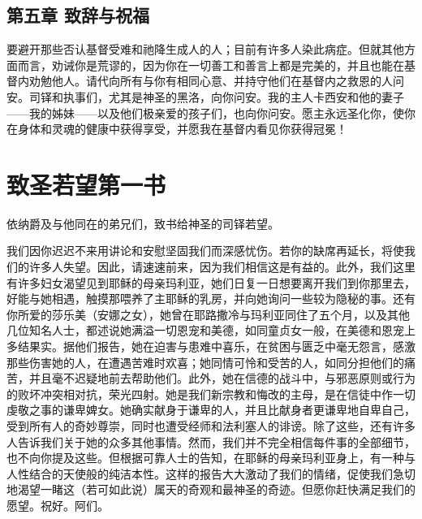 
\subsection{第五章 致辞与祝福}

要避开那些否认基督受难和祂降生成人的人；目前有许多人染此病症。但就其他方面而言，劝诫你是荒谬的，因为你在一切善工和善言上都是完美的，并且也能在基督内劝勉他人。请代向所有与你有相同心意、并持守他们在基督内之救恩的人问安。司铎和执事们，尤其是神圣的黑洛，向你问安。我的主人卡西安和他的妻子——我的姊妹——以及他们极亲爱的孩子们，也向你问安。愿主永远圣化你，使你在身体和灵魂的健康中获得享受，并愿我在基督内看见你获得冠冕！\par


\section{致圣若望第一书}

依纳爵及与他同在的弟兄们，致书给神圣的司铎若望。\par

我们因你迟迟不来用讲论和安慰坚固我们而深感忧伤。若你的缺席再延长，将使我们的许多人失望。因此，请速速前来，因为我们相信这是有益的。此外，我们这里有许多妇女渴望见到耶稣的母亲玛利亚，她们日复一日想要离开我们到你那里去，好能与她相遇，触摸那喂养了主耶稣的乳房，并向她询问一些较为隐秘的事。还有你所爱的莎乐美（安娜之女），她曾在耶路撒冷与玛利亚同住了五个月，以及其他几位知名人士，都述说她满溢一切恩宠和美德，如同童贞女一般，在美德和恩宠上多结果实。据他们报告，她在迫害与患难中喜乐，在贫困与匮乏中毫无怨言，感激那些伤害她的人，在遭遇苦难时欢喜；她同情可怜和受苦的人，如同分担他们的痛苦，并且毫不迟疑地前去帮助他们。此外，她在信德的战斗中，与邪恶原则或行为的败坏冲突相对抗，荣光四射。她是我们新宗教和悔改的主母，是在信徒中作一切虔敬之事的谦卑婢女。她确实献身于谦卑的人，并且比献身者更谦卑地自卑自己，受到所有人的奇妙尊崇，同时也遭受经师和法利塞人的诽谤。除了这些，还有许多人告诉我们关于她的众多其他事情。然而，我们并不完全相信每件事的全部细节，也不向你提及这些。但根据可靠人士的告知，在耶稣的母亲玛利亚身上，有一种与人性结合的天使般的纯洁本性。这样的报告大大激动了我们的情绪，促使我们急切地渴望一睹这（若可如此说）属天的奇观和最神圣的奇迹。但愿你赶快满足我们的愿望。祝好。阿们。\par


